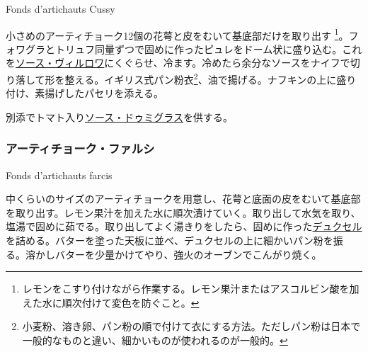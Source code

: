 \begin{recette}
\begin{frsubenv}

Fonds d'artichauts Cussy

\end{frsubenv}


小さめのアーティチョーク12個の花萼と皮をむいて基底部だけを取り出す
\footnote{レモンをこすり付けながら作業する。レモン果汁またはアスコルビン酸を加えた水に順次付けて変色を防ぐこと。}。フォワグラとトリュフ同量ずつで固めに作ったピュレをドーム状に盛り込む。これを\protect\hyperlink{sauce-villeroy}{ソース・ヴィルロワ}にくぐらせ、冷ます。冷めたら余分なソースをナイフで切り落して形を整える。イギリス式パン粉衣\footnote{小麦粉、溶き卵、パン粉の順で付けて衣にする方法。ただしパン粉は日本で一般的なものと違い、細かいものが使われるのが一般的。}、油で揚げる。ナフキンの上に盛り付け、素揚げしたパセリを添える。

別添でトマト入り\protect\hyperlink{sauce-demi-glace}{ソース・ドゥミグラス}を供する。

\atoaki{}

\hypertarget{fonds-d-artichauts-farcis}{%
\subsubsection{アーティチョーク・ファルシ}\label{fonds-d-artichauts-farcis}}

\begin{frsubenv}

Fonds d'artichauts farcis

\end{frsubenv}


中くらいのサイズのアーティチョークを用意し、花萼と底面の皮をむいて基底部を取り出す。レモン果汁を加えた水に順次漬けていく。取り出して水気を取り、塩湯で固めに茹でる。取り出してよく湯きりをしたら、固めに作った\protect\hyperlink{duxelles-seche}{デュクセル}を詰める。バターを塗った天板に並べ、デュクセルの上に細かいパン粉を振る。溶かしバターを少量かけてやり、強火のオーブンでこんがり焼く。


\end{recette}
